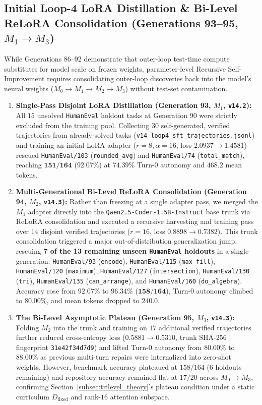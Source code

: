 \documentclass[10pt,twocolumn,letterpaper]{article}
\begin{document}
\subsection{Initial Loop-4 LoRA Distillation \& Bi-Level ReLoRA Consolidation (Generations 93--95, $M_{1}\to M_{3}$)}
While Generations 86--92 demonstrate that outer-loop test-time compute substitutes for model scale on frozen weights, parameter-level Recursive Self-Improvement requires consolidating outer-loop discoveries back into the model's neural weights ($M_{0}\to M_{1}\to M_{2}\to M_{3}$) without test-set contamination.
\begin{enumerate}
    \item \textbf{Single-Pass Disjoint LoRA Distillation (Generation 93, $M_{1}$, \texttt{v14.2}):} All $15$ unsolved \texttt{HumanEval} holdout tasks at Generation 90 were strictly excluded from the training pool. Collecting $30$ self-generated, verified trajectories from already-solved tasks (\texttt{v14\_\allowbreak loop4\_\allowbreak sft\_\allowbreak trajectories.jsonl}) and training an initial LoRA adapter ($r=8, \alpha=16$, loss $2.0937\to 1.4581$) rescued \texttt{HumanEval/103} (\texttt{rounded\_avg}) and \texttt{HumanEval/74} (\texttt{total\_match}), reaching $\mathbf{151/164}$ ($\mathbf{92.07\%}$) at $74.39\%$ Turn-0 autonomy and $468.2$ mean tokens.
    \item \textbf{Multi-Generational Bi-Level ReLoRA Consolidation (Generation 94, $M_{2}$, \texttt{v14.3}):} Rather than freezing at a single adapter pass, we merged the $M_{1}$ adapter directly into the \texttt{Qwen2.5-Coder-1.5B-Instruct} base trunk via ReLoRA consolidation and executed a recursive harvesting and training pass over $14$ disjoint verified trajectories ($r=16$, loss $0.8898\to 0.7382$). This trunk consolidation triggered a major out-of-distribution generalization jump, rescuing \textbf{7 of the 13 remaining unseen \texttt{HumanEval} holdouts} in a single generation: \texttt{HumanEval/93} (\texttt{encode}), \texttt{HumanEval/115} (\texttt{max\_fill}), \texttt{HumanEval/120} (\texttt{maximum}), \texttt{HumanEval/127} (\texttt{intersection}), \texttt{HumanEval/130} (\texttt{tri}), \texttt{HumanEval/135} (\texttt{can\_arrange}), and \texttt{HumanEval/160} (\texttt{do\_algebra}). Accuracy rose from $92.07\%$ to $\mathbf{96.34\%}$ ($\mathbf{158/164}$), Turn-0 autonomy climbed to $\mathbf{80.00\%}$, and mean tokens dropped to $\mathbf{240.0}$.
    \item \textbf{The Bi-Level Asymptotic Plateau (Generation 95, $M_{3}$, \texttt{v14.3}):} Folding $M_{2}$ into the trunk and training on $17$ additional verified trajectories further reduced cross-entropy loss ($0.5881\to 0.5310$, trunk SHA-256 fingerprint \texttt{31e42f34d7d9}) and lifted Turn-0 autonomy from $80.00\%$ to $\mathbf{88.00\%}$ as previous multi-turn repairs were internalized into zero-shot weights. However, benchmark accuracy plateaued at $158/164$ ($6$ holdouts remaining) and repository accuracy remained flat at $17/20$ across $M_{0}\to M_{3}$, confirming Section~\ref{subsec:trilevel_theory}'s plateau condition under a static curriculum $D_{\text{fixed}}$ and rank-$16$ attention subspace.
\end{enumerate}
\end{document}
